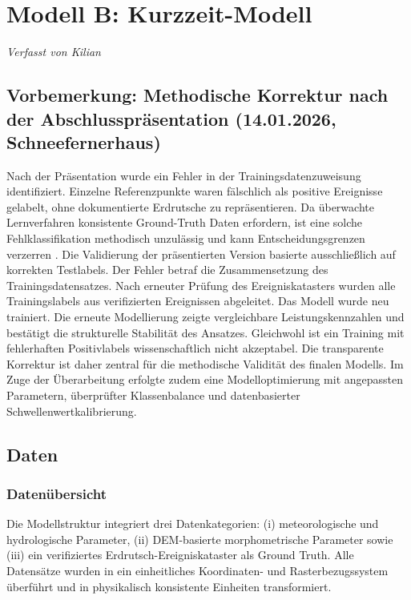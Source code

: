 \documentclass[../main.tex]{subfiles}
\begin{document}
\section{Modell B: Kurzzeit-Modell}
\vspace{-0.5cm}
\noindent\textit{\small Verfasst von Kilian}
\vspace{0.5cm}


\subsection{Vorbemerkung: Methodische Korrektur nach der Abschlusspräsentation (14.01.2026, Schneefernerhaus)}
Nach der Präsentation wurde ein Fehler in der Trainingsdatenzuweisung identifiziert.
Einzelne Referenzpunkte waren fälschlich als positive Ereignisse gelabelt, ohne dokumentierte Erdrutsche zu repräsentieren.
Da überwachte Lernverfahren konsistente Ground-Truth Daten erfordern, ist eine solche Fehlklassifikation methodisch unzulässig und kann Entscheidungsgrenzen verzerren \autocite{breimanRandomForests2001}.
Die Validierung der präsentierten Version basierte ausschließlich auf korrekten Testlabels.
Der Fehler betraf die Zusammensetzung des Trainingsdatensatzes.
Nach erneuter Prüfung des Ereigniskatasters wurden alle Trainingslabels aus verifizierten Ereignissen abgeleitet.
Das Modell wurde neu trainiert.
Die erneute Modellierung zeigte vergleichbare Leistungskennzahlen und bestätigt die strukturelle Stabilität des Ansatzes.
Gleichwohl ist ein Training mit fehlerhaften Positivlabels wissenschaftlich nicht akzeptabel.
Die transparente Korrektur ist daher zentral für die methodische Validität des finalen Modells.
Im Zuge der Überarbeitung erfolgte zudem eine Modelloptimierung mit angepassten Parametern, überprüfter Klassenbalance und datenbasierter Schwellenwertkalibrierung.

\subsection{Daten}

\subsubsection{Datenübersicht}
Die Modellstruktur integriert drei Datenkategorien: (i) meteorologische und hydrologische Parameter, (ii) DEM-basierte morphometrische Parameter sowie (iii) ein verifiziertes Erdrutsch-Ereigniskataster als Ground Truth. Alle Datensätze wurden in ein einheitliches Koordinaten- und Rasterbezugssystem überführt und in physikalisch konsistente Einheiten transformiert. \\
\end{document}

